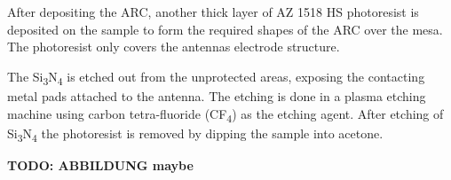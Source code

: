After depositing the ARC, another thick layer of AZ 1518 HS photoresist is deposited on the sample to form the required shapes of the ARC over the mesa. The photoresist only covers the antennas electrode structure. 

The Si\textsubscript{3}N\textsubscript{4} is etched out from the unprotected areas, exposing the contacting metal pads attached to the antenna. The etching is done in a plasma etching machine using carbon tetra-fluoride (CF\textsubscript{4}) as the etching agent. After etching of Si\textsubscript{3}N\textsubscript{4} the photoresist is removed by dipping the sample into acetone.


\textbf{TODO: ABBILDUNG maybe}